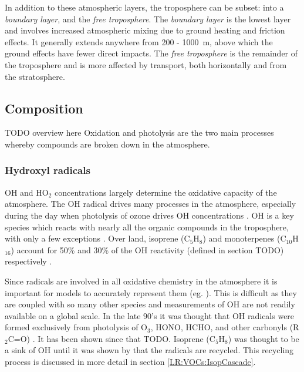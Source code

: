     
    
    In addition to these atmospheric layers, the troposphere can be subset: into a \textit{boundary layer}, and the \textit{free troposphere}.
    The \textit{boundary layer} is the lowest layer and involves increased atmospheric mixing due to ground heating and friction effects.
    It generally extends anywhere from 200 - 1000~m, above which the ground effects have fewer direct impacts.
    The \textit{free troposphere} is the remainder of the troposphere and is more affected by transport, both horizontally and from the stratosphere.
    
    
  \subsection{Composition}
  \label{LR:Atmos:Chem}
    TODO overview here
    Oxidation and photolysis are the two main processes whereby compounds are broken down in the atmosphere.
    
    \subsubsection{Hydroxyl radicals}
      OH and HO$_2$ concentrations largely determine the oxidative capacity of the atmosphere.
      The OH radical drives many processes in the atmosphere, especially during the day when photolysis of ozone drives OH concentrations \citep{Atkinson2000}.
      OH is a key species which reacts with nearly all the organic compounds in the troposphere, with only a few exceptions \citep{Atkinson2000}.
      Over land, isoprene (C$_5$H$_8$) and monoterpenes (C$_{10}$H$_{16}$) account for 50\% and 30\% of the OH reactivity (defined in section TODO) respectively \citep{Fuentes2000}. %
      
      Since radicals are involved in all oxidative chemistry in the atmosphere it is important for models to accurately represent them (eg. \cite{Travis2014}).
      This is difficult as they are coupled with so many other species and measurements of OH are not readily available on a global scale.
      In the late 90's it was thought that OH radicals were formed exclusively from photolysis of O$_3$, HONO, HCHO, and other carbonyls (R$_2$C=O) \cite{Atkinson2000}.
      It has been shown since that TODO. %
      Isoprene (C$_5$H$_8$) was thought to be a sink of OH until it was shown by \cite{Paulot2009b} that the radicals are recycled.
      This recycling process is discussed in more detail in section \ref{LR:VOCs:IsopCascade}.
      
